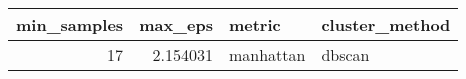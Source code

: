 \begin{tabular}{rrll}
\toprule
min_samples & max_eps & metric & cluster_method \\
\midrule
17 & 2.154031 & manhattan & dbscan \\
\bottomrule
\end{tabular}
